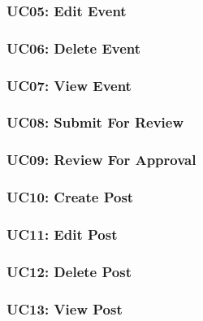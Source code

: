 \documentclass{article}
\begin{document}
\subsubsection{UC05: Edit Event}

\subsubsection{UC06: Delete Event}

\subsubsection{UC07: View Event}

\subsubsection{UC08: Submit For Review}

\subsubsection{UC09: Review For Approval}

\subsubsection{UC10: Create Post}

\subsubsection{UC11: Edit Post}

\subsubsection{UC12: Delete Post}

\subsubsection{UC13: View Post}

\end{document}
